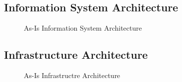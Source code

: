 \subsection{Information System Architecture}
\begin{center}
	\begin{figure}[H]
		\centering
		\setlength\fboxsep{7pt}
		\setlength\fboxrule{0.5pt}
		\caption{As-Is Information System Architecture}
		\label{fig:map_information_as_is}
	\end{figure}
\end{center}
%
\subsection{Infrastructure Architecture}
\begin{center}
	\begin{figure}[H]
		\centering
		\setlength\fboxsep{7pt}
		\setlength\fboxrule{0.5pt}
		\caption{As-Is Infrastructre Architecture}
		\label{fig:map_technology_as_is}
	\end{figure}
\end{center}

